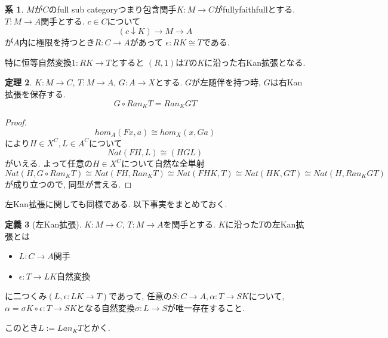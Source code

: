\documentclass[dvipdfmx,a4paper,11pt]{report}
\theoremstyle{definition}
\newtheorem{thm}{定理}
\newtheorem{cor}[thm]{系}
\newtheorem{dfn}[thm]{定義}
\begin{document}
 \begin{tcolorbox}
 [colback = white, colframe = green!35!black, fonttitle = \bfseries,breakable = true]
\begin{cor}
$M$が$C$のfull sub categoryつまり包含関手$K : M \to C$がfullyfaithfullとする. 
$T : M \to A$関手とする. 
$c \in C$について
$$
(c\downarrow K) \to M \to A
$$
が$A$内に極限を持つとき$R : C \to A$があって
$\epsilon : RK \cong T$である.

特に恒等自然変換$1: RK \to T$とすると
$(R,1)$は$T$の$K$に沿った右Kan拡張となる. 
\end{cor}
\end{tcolorbox}

 \begin{tcolorbox}
 [colback = white, colframe = green!35!black, fonttitle = \bfseries,breakable = true]
\begin{thm}
$K : M \to C$, $T : M \to A$, $G :  A \to X$とする.
$G$が左随伴を持つ時, $G$は右Kan拡張を保存する. 
$$
G \circ Ran_{K} T = Ran_{K}GT
$$
\end{thm}
\end{tcolorbox}

\begin{proof}
$$
hom_{A}(Fx, a) \cong hom_{X}(x,Ga)
$$
により$H \in X^C, L \in A^C$について
$$
Nat(FH, L) \cong (H GL)
$$
がいえる.
よって任意の$H \in X^C$について自然な全単射
$$
Nat(H, G\circ Ran_{K} T )
\cong 
Nat(FH, Ran_{K} T )
\cong 
Nat(FHK, T)
\cong 
Nat(HK, GT)
\cong 
Nat(H, Ran_{K}GT)
$$
が成り立つので, 同型が言える. 
\end{proof}

左Kan拡張に関しても同様である. 
以下事実をまとめておく. 

 \begin{tcolorbox}
 [colback = white, colframe = green!35!black, fonttitle = \bfseries,breakable = true]
\begin{dfn}[左Kan拡張]
$K : M \to C$, $T : M \to A$を関手とする.
$K$に沿った$T$の左Kan拡張とは
\begin{itemize}
\item $L : C \to A$関手
\item $\epsilon :  T \to LK$自然変換
\end{itemize}
に二つくみ$(L, \epsilon : LK \to T)$であって, 
任意の$S : C \to A, \alpha :  T \to SK $について, $\alpha = \sigma K \circ \epsilon:  T \to SK$となる自然変換$\sigma : L \to S$が唯一存在すること. 

このとき$L := Lan_{K}T$とかく. 
\end{dfn}
\end{tcolorbox}
\end{document}
